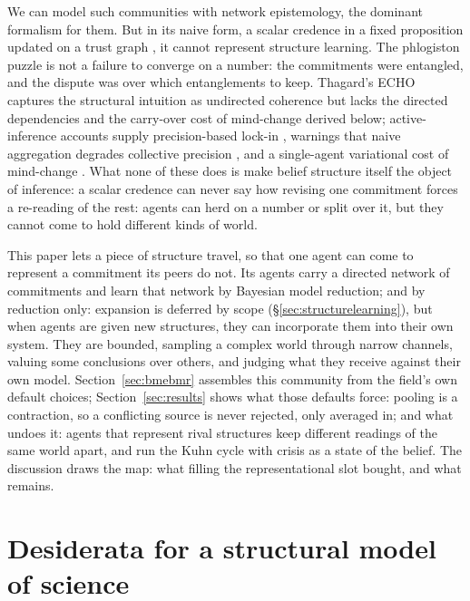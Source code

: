\documentclass[runningheads]{llncs}
\begin{document}
We can model such communities with network epistemology, the dominant formalism for them. But
in its naive form, a scalar credence in a fixed proposition updated on a trust graph
\citep{zollman2010,oconnor2019,zollman2013,jonard2025,michelini2023}, it cannot represent
structure learning. The phlogiston puzzle
is not a failure to converge on a number: the commitments were entangled, and the
dispute was over which entanglements to keep. Thagard's ECHO \citep{thagard1989,thagard1990}
captures the structural intuition as undirected coherence but lacks the directed dependencies
and the carry-over cost of mind-change derived below; active-inference accounts supply precision-based
lock-in \citep{albarracin2022}, warnings that naive aggregation degrades collective precision
\citep{friston2023federated,waade2025}, and a single-agent variational cost of mind-change
\citep{hyland2025}. What none of these does is make belief structure itself the object
of inference: a scalar credence can never say how revising one commitment forces a re-reading
of the rest: agents can herd on a number or split over it, but they cannot come to hold
different kinds of world.

This paper lets a piece of structure travel, so that one agent can come to represent a
commitment its peers do not. Its agents carry a directed network of commitments and learn that
network by Bayesian model reduction; and by reduction only: expansion is deferred by
scope (\S\ref{sec:structurelearning}), but when agents are given new structures, they
can incorporate them into their own system. They are bounded, sampling a complex
world through narrow channels, valuing some conclusions over others, and judging what they
receive against their own model. Section~\ref{sec:bmebmr} assembles this community from the
field's own default choices; Section~\ref{sec:results} shows what those defaults force: pooling is a
contraction, so a conflicting source is never rejected, only averaged in; and what undoes it:
agents that represent rival structures keep different readings of the same world apart, and
run the Kuhn cycle with crisis as a state of the belief. The discussion
draws the map: what filling the representational slot bought, and what
remains.

\section{Desiderata for a structural model of science}
\label{sec:hidden}
\end{document}

